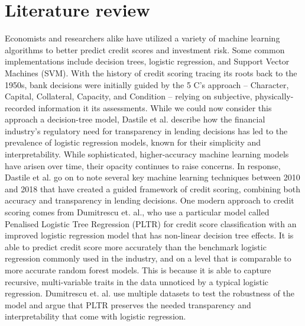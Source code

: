 \documentclass[11pt, twocolumn]{article}
\begin{document}
\section*{Literature review}
Economists and researchers alike have utilized a variety of machine learning algorithms to better predict credit scores and investment risk.
Some common implementations include decision trees, logistic regression, and Support Vector Machines (SVM).
\vspace{5mm}\newline
With the history of credit scoring tracing its roots back to the 1950s, bank decisions were initially guided by the
5 C's approach -- Character, Capital, Collateral, Capacity, and Condition -- relying on subjective, physically-recorded information it its
assessments.
While we could now consider this approach a decision-tree model, Dastile et al. describe how the financial industry's regulatory need for
transparency in lending decisions has led to the prevalence of logistic regression models, known for their simplicity and interpretability.
While sophisticated, higher-accuracy machine learning models have arisen over time, their opacity continues to raise concerns.
In response, Dastile et al. go on to note several key machine learning techniques between 2010 and 2018 that have created a guided
framework of credit scoring, combining both accuracy and transparency in lending decisions.
\vspace{5mm}\newline
One modern approach to credit scoring comes from Dumitrescu et. al., who use a particular model called Penalised Logistic Tree Regression
(PLTR) for credit score classification with an improved logistic regression model that has non-linear decision tree effects.
It is able to predict credit score more accurately than the benchmark logistic regression commonly used in the industry, and on a level
that is comparable to more accurate random forest models.
This is because it is able to capture recursive, multi-variable traits in the data unnoticed by a typical logistic regression.
Dumitrescu et. al. use multiple datasets to test the robustness of the model and argue that PLTR preserves the needed transparency and
interpretability that come with logistic regression.
\end{document}
